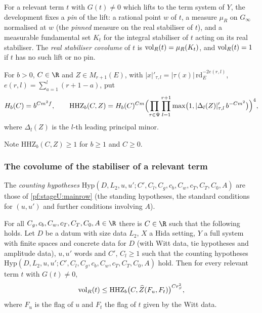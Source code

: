 \begin{definition}\label{pf:sh-flag:defvolr}
For a relevant term $t$ with $G(t)\ne0$ which lifts to the term system of $Y$, the development fixes a \emph{pin} of the
lift: a rational point $w$ of $t$, a measure $\mu_R$ on $G_\infty$ normalised at $w$ (the \emph{pinned} measure on the real
stabiliser of $t$), and a measurable fundamental set $K_t$ for the integral stabiliser of $t$ acting on its real
stabiliser. The \emph{real stabiliser covolume} of $t$ is $\operatorname{vol}_R(t)=\mu_R(K_t)$, and $\operatorname{vol}_R(t)=1$ if $t$ has no
such lift or no pin.
\end{definition}

\begin{definition}\label{pf:sh-flag:defhhz}
For $b>0$, $C\in\R$ and $Z\in M_{r+1}(E)$, with $|x|'_{\tau,l}=|\tau(x)|\,\mathrm{rd}_E^{-2e(r,l)}$, $e(r,l)=\sum_{a=1}^l(r+1-a)$,
put
\begin{equation}\label{pf:sh-flag:eq:hhz}
H_b(C)=b^{Cm^2f},\qquad \mathrm{HHZ}_b(C,Z)=H_b(C)^{Cm}\Bigl(\prod_{\tau\in\Psi}\prod_{l=1}^{r+1}
\max\bigl(1,|\Delta_l(Z)|'_{\tau,l}\,b^{-Cm^2}\bigr)\Bigr)^4,
\end{equation}
where $\Delta_l(Z)$ is the $l$-th leading principal minor.
\ 
\end{definition}
Note $\mathrm{HHZ}_b(C,Z)\ge1$ for $b\ge1$ and $C\ge0$.

\subsubsection{The covolume of the stabiliser of a relevant term}

\begin{definition}\label{pf:sh-flag:defhyp}
The \emph{counting hypotheses} $\mathrm{Hyp}(D,L_2,u,u';C',C_l,C_g,c_b,C_w,c_T,C_T,C_0,A)$ are those of \cref{pf:stageU:mainrow}
(the standing hypotheses, the standard conditions for $(u,u')$ and further conditions involving $A$).
\end{definition}

\begin{theorem}\label{pf:sh-flag:stabcov}
For all $C_g,c_b,C_w,c_T,C_T,C_0,A\in\R$ there is $C\in\R$ such that the following holds. Let $D$ be a datum with size data
$L_2$, $X$ a Hida setting, $Y$ a full system with finite spaces and concrete data for $D$ (with Witt data, tie hypotheses
and amplitude data), $u,u'$ words and $C'$, $C_l\ge1$ such that the counting hypotheses
$\mathrm{Hyp}(D,L_2,u,u';C',C_l,C_g,c_b,C_w,c_T,C_T,C_0,A)$ hold. Then for every relevant term $t$ with $G(t)\ne0$,
\[
\operatorname{vol}_R(t)\le\mathrm{HHZ}_b\bigl(C,\widehat Z(F_u,F_t)\bigr)^{Cr_S^2},
\]
where $F_u$ is the flag of $u$ and $F_t$ the flag of $t$ given by the Witt data.
\end{theorem}

